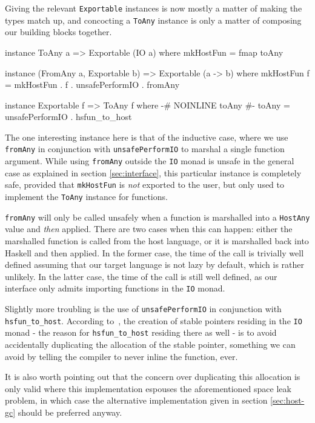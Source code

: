 \documentclass{sigplanconf}
\begin{document}
Giving the relevant \lstinline!Exportable! instances is now mostly a matter of
making the types match up, and concocting a \lstinline!ToAny! instance is only
a matter of composing our building blocks together.

\begin{code}
  instance ToAny a => Exportable (IO a) where
    mkHostFun = fmap toAny

  instance (FromAny a, Exportable b) =>
           Exportable (a -> b) where
    mkHostFun f =
      mkHostFun . f . unsafePerformIO . fromAny
  
  instance Exportable f => ToAny f where
    {-# NOINLINE toAny #-}
    toAny = unsafePerformIO . hsfun_to_host
\end{code}

The one interesting instance here is that of the inductive case, where we use
\lstinline!fromAny! in conjunction with \lstinline!unsafePerformIO! to marshal
a single function argument. While using \lstinline!fromAny! outside the
\lstinline!IO! monad is unsafe in the general case as explained in section
\ref{sec:interface}, this particular instance is completely safe, provided that
\lstinline!mkHostFun! is \emph{not} exported to the user, but only used to
implement the \lstinline!ToAny! instance for functions.

\lstinline!fromAny! will only be called unsafely when a function is marshalled
into a \lstinline!HostAny! value and \emph{then} applied. There are two cases
when this can happen: either the marshalled function is called from the host
language, or it is marshalled back into Haskell and then applied.
In the former case, the time of the call is trivially well defined assuming
that our target language is not lazy by default, which is rather unlikely.
In the latter case, the time of the call is still well defined, as our
interface only admits importing functions in the \lstinline!IO! monad.

Slightly more troubling is the use of \lstinline!unsafePerformIO! in
conjunction with \lstinline!hsfun_to_host!.
According to\ \cite{stableptr}, the creation of stable pointers residing in
the \lstinline!IO! monad - the reason for \lstinline!hsfun_to_host! residing
there as well - is to avoid accidentally duplicating the allocation of the
stable pointer, something we can avoid by telling the compiler to never
inline the function, ever.

It is also worth pointing out that the concern over duplicating this allocation
is only valid where this implementation espouses the aforementioned space leak
problem, in which case the alternative implementation given in section
\ref{sec:host-gc} should be preferred anyway.
\end{document}
